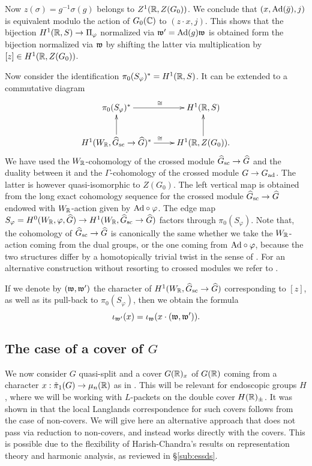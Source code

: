 \documentclass{article}
\theoremstyle{definition}
\numberwithin{equation}{section}
\renewcommand{\-}{\hyp{}}
\begin{document}
Now $z(\sigma)=g^{-1}\sigma(g)$ belongs to $Z^1(\mathbb{R},Z(G_0))$. We conclude that $(x,\textrm{Ad}(\bar g),j)$ is equivalent modulo the action of $G_0(\mathbb{C})$ to $(z\cdot x,j)$. This shows that the bijection $H^1(\mathbb{R},S) \to \Pi_\varphi$ normalized via $\mathfrak{w'}=\textrm{Ad}(g)\mathfrak{w}$ is obtained form the bijection normalized via $\mathfrak{w}$ by shifting the latter via multiplication by $[z] \in H^1(\mathbb{R},Z(G_0))$. 

Now consider the identification $\pi_0(S_\varphi)^* = H^1(\mathbb{R},S)$. It can be extended to a commutative diagram
\[ \xymatrix{
	\pi_0(S_\varphi)^*\ar[r]^\cong&H^1(\R,S)\\
	H^1(W_\R,\hat G_\tx{sc} \to \hat G)^*\ar[u]\ar[r]^\cong&H^1(\R,Z(G_0)).\ar[u]
}
\]
We have used  the $W_{\mathbb{R}}$-cohomology of the crossed module $\widehat G_{\textrm{sc}} \to \widehat G$ and the duality between it and the $\Gamma$-cohomology of the crossed module $G \to G_{\textrm{ad}}$. The latter is however quasi-isomorphic to $Z(G_0)$. The left vertical map is obtained from the long exact cohomology sequence for the crossed module $\widehat G_{\textrm{sc}} \to \widehat G$ endowed with $W_{\mathbb{R}}$-action given by $\textrm{Ad}\circ\varphi$. The edge map $S_\varphi=H^0(W_{\mathbb{R}},\varphi,\widehat G) \to H^1(W_{\mathbb{R}},\widehat G_{\textrm{sc}} \to \widehat G)$ factors through $\pi_0(S_\varphi)$. Note that, the cohomology of $\widehat G_{\textrm{sc}} \to \widehat G$ is canonically the same whether we take the $W_{\mathbb{R}}$-action coming from the dual groups, or the one coming from $\textrm{Ad}\circ\varphi$, because the two structures differ by a homotopically trivial twist in the sense of \cite[\S2.4]{KalECI}. For an alternative construction without resorting to crossed modules we refer to \cite[\S4]{KalGen}.

If we denote by $(\mathfrak{w},\mathfrak{w'})$ the character of $H^1(W_{\mathbb{R}},\widehat G_{\textrm{sc}} \to \widehat G)$ corresponding to $[z]$, as well as its pull-back to $\pi_0(S_\varphi)$, then we obtain the formula
\begin{equation}
	\iota_{\mathfrak{w'}}(x) = \iota_{\mathfrak{w}}(x \cdot (\mathfrak{w},\mathfrak{w'})).
\end{equation}


\subsection{The case of a cover of $G$} \label{sub:packetcover}

We now consider $G$ quasi-split and a cover $G(\mathbb{R})_x$ of $G(\mathbb{R})$ coming from a character $x : \tilde\pi_1(G) \to \mu_n(\mathbb{R})$ as in \cite{KalHDC}. This will be relevant for endoscopic groups $H$, where we will be working with $L$\-packets on the double cover $H(\mathbb{R})_\pm$. It was shown in \cite[\S2.6]{KalHDC} that the local Langlands correspondence for such covers follows from the case of non-covers. We will give here an alternative approach that does not pass via reduction to non-covers, and instead works directly with the covers. This is possible due to the flexibility of Harish-Chandra's results on representation theory and harmonic analysis, as reviewed in \S\ref{sub:essds}.
\end{document}
